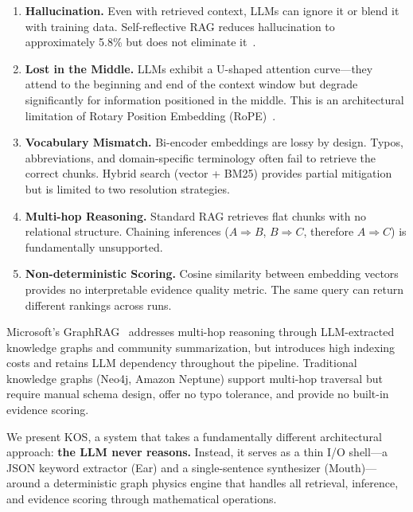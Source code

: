 \documentclass[11pt,a4paper]{article}
\begin{document}
\begin{enumerate}
  \item \textbf{Hallucination.} Even with retrieved context, LLMs can ignore it or blend it with training data. Self-reflective RAG reduces hallucination to approximately 5.8\% but does not eliminate it~\cite{lewis2020rag}.

  \item \textbf{Lost in the Middle.} LLMs exhibit a U-shaped attention curve---they attend to the beginning and end of the context window but degrade significantly for information positioned in the middle. This is an architectural limitation of Rotary Position Embedding (RoPE)~\cite{liu2024lost}.

  \item \textbf{Vocabulary Mismatch.} Bi-encoder embeddings are lossy by design. Typos, abbreviations, and domain-specific terminology often fail to retrieve the correct chunks. Hybrid search (vector + BM25) provides partial mitigation but is limited to two resolution strategies.

  \item \textbf{Multi-hop Reasoning.} Standard RAG retrieves flat chunks with no relational structure. Chaining inferences ($A \Rightarrow B$, $B \Rightarrow C$, therefore $A \Rightarrow C$) is fundamentally unsupported.

  \item \textbf{Non-deterministic Scoring.} Cosine similarity between embedding vectors provides no interpretable evidence quality metric. The same query can return different rankings across runs.
\end{enumerate}

Microsoft's GraphRAG~\cite{edge2024graphrag} addresses multi-hop reasoning through LLM-extracted knowledge graphs and community summarization, but introduces high indexing costs and retains LLM dependency throughout the pipeline. Traditional knowledge graphs (Neo4j, Amazon Neptune) support multi-hop traversal but require manual schema design, offer no typo tolerance, and provide no built-in evidence scoring.

We present KOS, a system that takes a fundamentally different architectural approach: \textbf{the LLM never reasons.} Instead, it serves as a thin I/O shell---a JSON keyword extractor (Ear) and a single-sentence synthesizer (Mouth)---around a deterministic graph physics engine that handles all retrieval, inference, and evidence scoring through mathematical operations.
\end{document}

